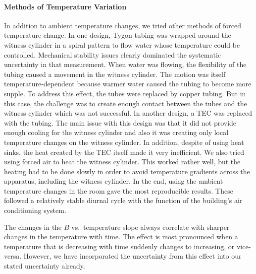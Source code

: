 \paragraph{Methods of Temperature Variation}

In addition to ambient temperature changes, we tried other methods of
forced temperature change.  In one design, Tygon tubing was wrapped
around the witness cylinder in a spiral pattern to flow water whose
temperature could be controlled.  Mechanical stability issues clearly
dominated the systematic uncertainty in that measurement.  When water
was flowing, the flexibility of the tubing caused a movement in the
witness cylinder.  The motion was itself temperature-dependent because
warmer water caused the tubing to become more supple.  To address this
effect, the tubes were replaced by copper tubing.  But in this case,
the challenge was to create enough contact between the tubes and the
witness cylinder which was not successful. In another design, a TEC
was replaced with the tubing. The main issue with this design was that
it did not provide enough cooling for the witness cylinder and also it
was creating only local temperature changes on the witness
cylinder. In addition, despite of using heat sinks, the heat created
by the TEC itself made it very inefficient.  We also tried using
forced air to heat the witness cylinder.  This worked rather well, but
the heating had to be done slowly in order to avoid temperature
gradients across the apparatus, including the witness cylinder.  In
the end, using the ambient temperature changes in the room gave the
most reproducible results.  These followed a relatively stable diurnal
cycle with the function of the building's air conditioning system.

The changes in the $B$ vs.~temperature slope always correlate with
sharper changes in the temperature with time.  The effect is most
pronounced when a temperature that is decreasing with time suddenly
changes to increasing, or vice-versa.  However, we have incorporated
the uncertainty from this effect into our stated uncertainty already.






